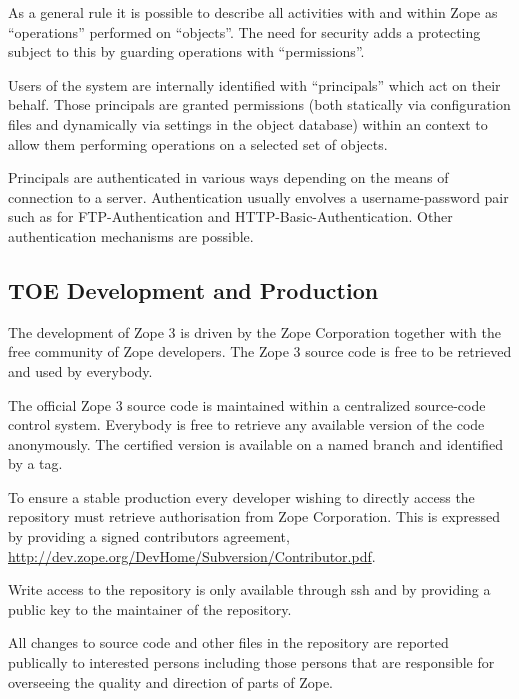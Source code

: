 \documentclass[10pt,a4paper,english]{article}
\begin{document}
As a general rule it is possible to describe all activities with and within Zope as
``operations'' performed on ``objects''. The need for security adds a protecting
subject to this by guarding operations with ``permissions''.

Users of the system are internally identified with ``principals'' which act on
their behalf.  Those principals are granted permissions (both statically via
configuration files and dynamically via settings in the object database) within
an context to allow them performing operations on a selected set of objects.

Principals are authenticated in various ways depending on the means of
connection to a server.  Authentication usually envolves a username-password
pair such as for FTP-Authentication and HTTP-Basic-Authentication.  Other
authentication mechanisms are possible.



\hypertarget{toe-development-and-production}{}
\subsection*{TOE Development and Production}

The development of Zope 3 is driven by the Zope Corporation together with the
free community of Zope developers. The Zope 3 source code is free to be
retrieved and used by everybody.

The official Zope 3 source code is maintained within a centralized source-code
control system.  Everybody is free to retrieve any available version of the
code anonymously. The certified version is available on a named branch and
identified by a tag.

To ensure a stable production every developer wishing to directly access the
repository must retrieve authorisation from Zope Corporation. This is
expressed by providing a signed contributors agreement,
\href{http://dev.zope.org/DevHome/Subversion/Contributor.pdf}{http://dev.zope.org/DevHome/Subversion/Contributor.pdf}.

Write access to the repository is only available through ssh and by providing
a public key to the maintainer of the repository.

All changes to source code and other files in the repository are reported
publically to interested persons including those persons that are responsible
for overseeing the quality and direction of parts of Zope.
\end{document}
